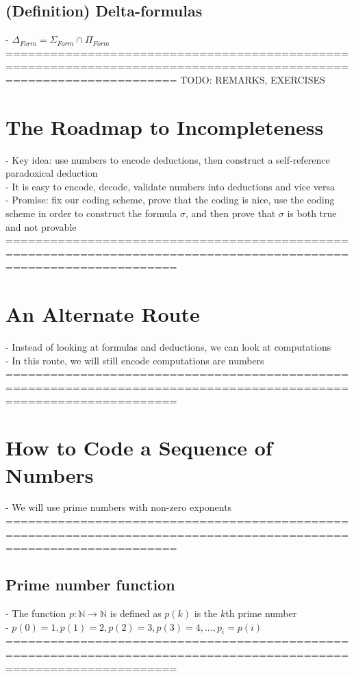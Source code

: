 \documentclass{book}
\begin{document}
\subsection{(Definition) Delta-formulas} %
	- $\Delta_{Form} = \Sigma_{Form} \cap \Pi_{Form}$ \\
	===================================================================================================================
	TODO: REMARKS, EXERCISES

\section{The Roadmap to Incompleteness}
	- Key idea: use numbers to encode deductions, then construct a self-reference paradoxical deduction \\
	- It is easy to encode, decode, validate numbers into deductions and vice versa \\
	- Promise: fix our coding scheme, prove that the coding is nice, use the coding scheme in order to construct the formula $\sigma$, and then prove that $\sigma$ is both true and not provable \\
	===================================================================================================================

\section{An Alternate Route}
	- Instead of looking at formulas and deductions, we can look at computations \\
	- In this route, we will still encode computations are numbers \\
	===================================================================================================================

\section{How to Code a Sequence of Numbers}
	- We will use prime numbers with non-zero exponents \\
	===================================================================================================================
\subsection{Prime number function} %
	- The function $p: \mathbb{N} \rightarrow \mathbb{N}$ is defined as $p(k)$ is the $k$th prime number \\
	- $p(0) = 1, p(1) = 2, p(2) = 3, p(3) = 4, ..., p_i = p(i)$ \\
	===================================================================================================================
\end{document}
